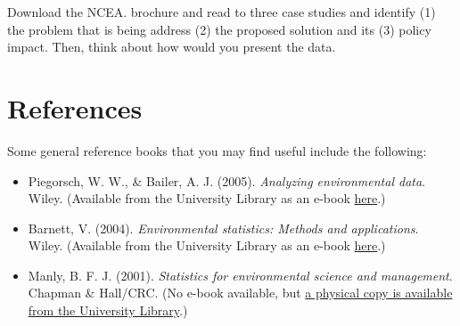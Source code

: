\documentclass[
  letterpaper,
  DIV=11,
  numbers=noendperiod]{scrartcl}
\providecommand{\tightlist}{%
  \setlength{\itemsep}{0pt}\setlength{\parskip}{0pt}}\usepackage{longtable,booktabs,array}
\begin{document}
\begin{tcolorbox}[enhanced jigsaw, left=2mm, toprule=.15mm, rightrule=.15mm, coltitle=black, arc=.35mm, colframe=quarto-callout-tip-color-frame, breakable, bottomtitle=1mm, colback=white, titlerule=0mm, toptitle=1mm, title={Exercise 6}, bottomrule=.15mm, colbacktitle=quarto-callout-tip-color!10!white, opacitybacktitle=0.6, opacityback=0, leftrule=.75mm]

Download the NCEA. brochure and read to three case studies and identify
(1) the problem that is being address (2) the proposed solution and its
(3) policy impact. Then, think about how would you present the data.

\end{tcolorbox}

\section*{References}\label{references}

Some general reference books that you may find useful include the
following:

\begin{itemize}
\tightlist
\item
  Piegorsch, W. W., \& Bailer, A. J. (2005). \emph{Analyzing
  environmental data}. Wiley. (Available from the University Library as
  an e-book \href{https://go.exlibris.link/6wbh6zq0}{here}.)
\item
  Barnett, V. (2004). \emph{Environmental statistics: Methods and
  applications}. Wiley. (Available from the University Library as an
  e-book \href{https://go.exlibris.link/TbMBCTkV}{here}.)
\item
  Manly, B. F. J. (2001). \emph{Statistics for environmental science and
  management}. Chapman \& Hall/CRC. (No e-book available, but
  \href{https://go.exlibris.link/Jcyj94mj}{a physical copy is available
  from the University Library}.)
\end{itemize}
\end{document}
